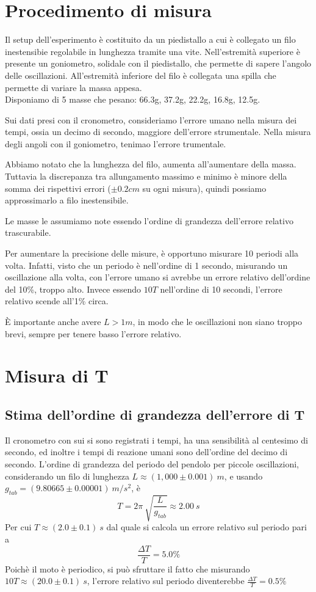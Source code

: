 \documentclass[12pt, a4paper]{article}
\begin{document}
    
\section{Procedimento di misura}
Il setup dell'esperimento è costituito da un piedistallo a cui è collegato un filo inestensibie regolabile in lunghezza tramite una vite. Nell'estremità superiore è presente un goniometro, solidale con il piedistallo, che permette di sapere l'angolo delle oscillazioni. All'estremità inferiore del filo è collegata una spilla che permette di variare la massa appesa. \\
Disponiamo di 5 masse che pesano: 66.3g, 37.2g, 22.2g, 16.8g, 12.5g.

Sui dati presi con il cronometro, consideriamo l'errore umano nella misura dei tempi, ossia un decimo di secondo, maggiore dell'errore strumentale. 
Nella misura degli angoli con il goniometro, tenimao l'errore trumentale. 

Abbiamo notato che la lunghezza del filo, aumenta all'aumentare della massa. Tuttavia la discrepanza tra allungamento massimo e minimo è minore della somma dei rispettivi errori ($\pm0.2cm$ su ogni misura), quindi possiamo approssimarlo a filo inestensibile.

Le masse le assumiamo note essendo l'ordine di grandezza dell'errore relativo trascurabile.

Per aumentare la precisione delle misure, è opportuno misurare 10 periodi alla volta.
Infatti, visto che un periodo è nell'ordine di 1 secondo, misurando un oscillazione alla volta, con l'errore umano si avrebbe un errore relativo dell'ordine del 10\%, troppo alto.
Invece essendo $10T$ nell'ordine di 10 secondi, l'errore relativo scende all'1\% circa.

È importante anche avere $L > 1m$, in modo che le oscillazioni non siano troppo brevi, sempre per tenere basso l'errore relativo.


\section{Misura di T}
\subsection{Stima dell'ordine di grandezza dell'errore di T}
Il cronometro con sui si sono registrati i tempi, ha una sensibilità al centesimo di secondo, ed inoltre i tempi di reazione umani sono dell'ordine del decimo di secondo. L'ordine di grandezza del periodo del pendolo per piccole oscillazioni, considerando un filo di lunghezza $L\approx (1,000\pm 0.001)\ m$, e usando $g_{tab}=(9.80665\pm0.00001) \ m/s^2$, è
\begin{equation*}
    T= 2\pi\ \sqrt{\frac{L}{g_{tab}}}\approx 2.00\ s
\end{equation*}
Per cui $T\approx(2.0\pm 0.1)\ s$ dal quale si calcola un errore relativo sul periodo pari a
 \begin{equation*}
     \frac{\Delta T}{T}=5.0\%
 \end{equation*}
Poichè il moto è periodico, si può sfruttare il fatto che misurando $10T\approx(20.0\pm 0.1)\ s$, l'errore relativo sul periodo diventerebbe $\displaystyle \frac{\Delta T}{T} = 0.5\% $
\newpage
\end{document}

